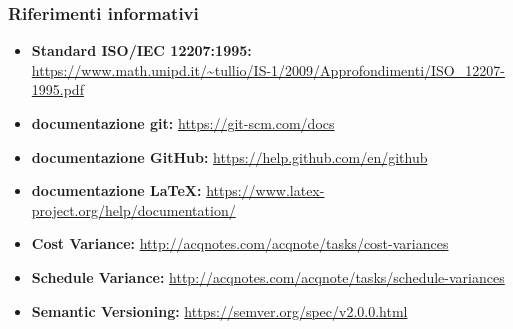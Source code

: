 		\subsubsection{Riferimenti informativi}
			\begin{itemize}
				\item \textbf{Standard ISO/IEC 12207:1995: } \\
				\url{https://www.math.unipd.it/~tullio/IS-1/2009/Approfondimenti/ISO_12207-1995.pdf}
				\item \textbf{documentazione git: }\url{https://git-scm.com/docs} 
				\item \textbf{documentazione GitHub: }\url{https://help.github.com/en/github}
				\item \textbf{documentazione LaTeX: }\url{https://www.latex-project.org/help/documentation/}
				\item \textbf{Cost Variance: } \url{http://acqnotes.com/acqnote/tasks/cost-variances}
				\item \textbf{Schedule Variance: } \url{http://acqnotes.com/acqnote/tasks/schedule-variances}
				\item \textbf{Semantic Versioning:} \url{https://semver.org/spec/v2.0.0.html}
			\end{itemize}
		

